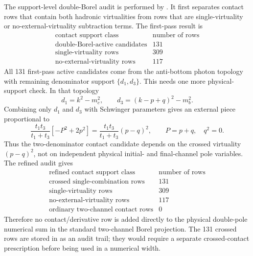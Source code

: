\documentclass[11pt]{article}
\begin{document}
The support-level double-Borel audit is performed by
.  It first separates contact rows
that contain both hadronic virtualities from rows that are single-virtuality or
no-external-virtuality subtraction terms.  The first-pass result is
\[
\begin{array}{c|c}
\text{contact support class} & \text{number of rows}\\
\hline
\text{double-Borel-active candidates} & 131\\
\text{single-virtuality rows} & 309\\
\text{no-external-virtuality rows} & 117
\end{array}
\]
All 131 first-pass active candidates come from the anti-bottom photon topology
with remaining denominator support \(\{d_1,d_3\}\).  This needs one more
physical-support check.  In that topology
\[
d_1=k^2-m_c^2,\qquad d_3=(k-p+q)^2-m_b^2 .
\]
Combining only \(d_1\) and \(d_3\) with Schwinger parameters gives an external
piece proportional to
\[
 \frac{t_1t_3}{t_1+t_3}\left[-P^2+2p^2\right]
 =
 \frac{t_1t_3}{t_1+t_3}(p-q)^2,
 \qquad P=p+q,\quad q^2=0 .
\]
Thus the two-denominator contact candidate depends on the crossed virtuality
\((p-q)^2\), not on independent physical initial- and final-channel pole
variables.  The refined audit
 gives
\[
\begin{array}{c|c}
\text{refined contact support class} & \text{number of rows}\\
\hline
\text{crossed single-combination rows} & 131\\
\text{single-virtuality rows} & 309\\
\text{no-external-virtuality rows} & 117\\
\text{ordinary two-channel contact rows} & 0
\end{array}
\]
Therefore no contact/derivative row is added directly to the physical
double-pole numerical sum in the standard two-channel Borel projection.  The
131 crossed rows are stored in
 as an audit trail; they would
require a separate crossed-contact prescription before being used in a
numerical width.
\end{document}
